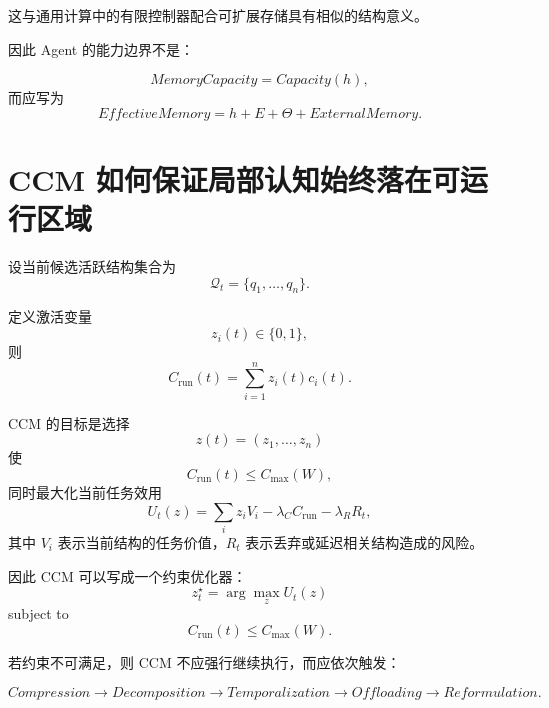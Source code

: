 这与通用计算中的有限控制器配合可扩展存储具有相似的结构意义。

因此 Agent 的能力边界不是：

\begin{equation}
MemoryCapacity=Capacity(h),
\end{equation}
而应写为
\begin{equation}
\boxed{
EffectiveMemory
=
h
+
E
+
\Theta
+
ExternalMemory.
}
\end{equation}

\section{CCM 如何保证局部认知始终落在可运行区域}

设当前候选活跃结构集合为
\begin{equation}
\mathcal Q_t
=
\{q_1,\ldots,q_n\}.
\end{equation}

定义激活变量
\begin{equation}
z_i(t)\in\{0,1\},
\end{equation}
则
\begin{equation}
C_{\mathrm{run}}(t)
=
\sum_{i=1}^{n}
z_i(t)c_i(t).
\end{equation}

CCM 的目标是选择
\begin{equation}
z(t)
=
(z_1,\ldots,z_n)
\end{equation}
使
\begin{equation}
C_{\mathrm{run}}(t)
\leq
C_{\max}(W),
\end{equation}
同时最大化当前任务效用
\begin{equation}
U_t(z)
=
\sum_i
z_i
V_i
-
\lambda_C C_{\mathrm{run}}
-
\lambda_R R_t,
\end{equation}
其中 $V_i$ 表示当前结构的任务价值，$R_t$ 表示丢弃或延迟相关结构造成的风险。

因此 CCM 可以写成一个约束优化器：
\begin{equation}
z^\star_t
=
\arg\max_z
U_t(z)
\end{equation}
subject to
\begin{equation}
C_{\mathrm{run}}(t)
\leq
C_{\max}(W).
\end{equation}

若约束不可满足，则 CCM 不应强行继续执行，而应依次触发：

\begin{equation}
Compression
\rightarrow
Decomposition
\rightarrow
Temporalization
\rightarrow
Offloading
\rightarrow
Reformulation.
\end{equation}

